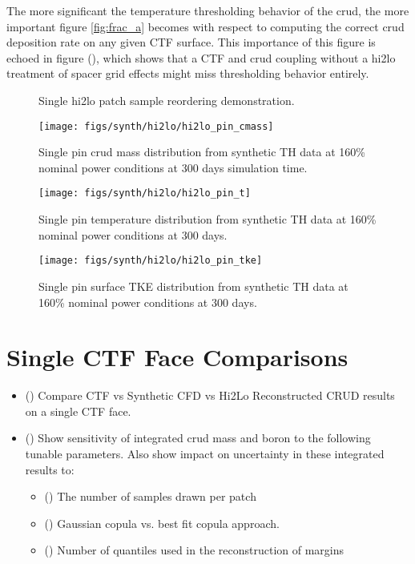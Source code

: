 The more significant the temperature thresholding behavior of the crud, the more important figure \ref{fig:frac_a} becomes with respect to computing the correct crud deposition rate on any given CTF surface.  This importance of this figure is echoed in figure (), which shows that a CTF and crud coupling without a hi2lo treatment of spacer grid effects might miss thresholding behavior entirely.

\begin{figure}[H]%
    \centering
    \qquad
    \caption[]{Single hi2lo patch sample reordering demonstration.}%
    \label{fig:reshuffle_a}%
\end{figure}


\begin{figure}[H]
    \centering
    \texttt{[image: figs/synth/hi2lo/hi2lo\_pin\_cmass]}
    \caption[Single pin crud mass distribution from synthetic TH data.]{Single pin crud mass distribution from synthetic TH data at 160\% nominal power conditions at 300 days simulation time.}
    \label{fig:hi2lopincmass}
\end{figure}
\begin{figure}[H]
    \centering
    \texttt{[image: figs/synth/hi2lo/hi2lo\_pin\_t]}
    \caption{Single pin temperature distribution from synthetic TH data at 160\% nominal power conditions at 300 days.}
    \label{fig:hi2lopint}
\end{figure}
\begin{figure}[H]
    \centering
    \texttt{[image: figs/synth/hi2lo/hi2lo\_pin\_tke]}
    \caption{Single pin surface TKE distribution from synthetic TH data at 160\% nominal power conditions at 300 days.}
    \label{fig:hi2lopintke}
\end{figure}

\section{Single CTF Face Comparisons}
\begin{itemize}
    \item (\checkmark) Compare CTF vs Synthetic CFD vs Hi2Lo Reconstructed CRUD results on a single CTF face.
    \item (\checkmark) Show sensitivity of integrated crud mass and boron to the following tunable parameters.  Also show impact on uncertainty in these integrated results to:
    \begin{itemize}
        \item (\checkmark) The number of samples drawn per patch
        \item (\checkmark) Gaussian copula vs. best fit copula approach.
        \item (\checkmark) Number of quantiles used in the reconstruction of margins
    \end{itemize}
\end{itemize}

